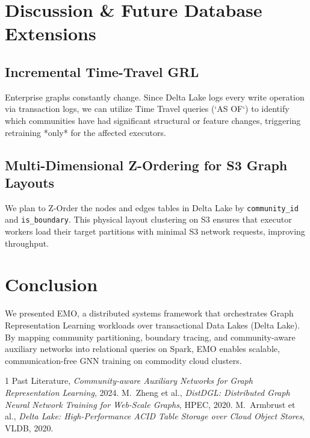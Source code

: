\documentclass[conference,compsoc]{IEEEtran}
\begin{document}
\section{Discussion \& Future Database Extensions}
\subsection{Incremental Time-Travel GRL}
Enterprise graphs constantly change. Since Delta Lake logs every write operation via transaction logs, we can utilize Time Travel queries (`AS OF`) to identify which communities have had significant structural or feature changes, triggering retraining *only* for the affected executors.

\subsection{Multi-Dimensional Z-Ordering for S3 Graph Layouts}
We plan to Z-Order the nodes and edges tables in Delta Lake by \verb|community_id| and \verb|is_boundary|. This physical layout clustering on S3 ensures that executor workers load their target partitions with minimal S3 network requests, improving throughput.

\section{Conclusion}
We presented EMO, a distributed systems framework that orchestrates Graph Representation Learning workloads over transactional Data Lakes (Delta Lake). By mapping community partitioning, boundary tracing, and community-aware auxiliary networks into relational queries on Spark, EMO enables scalable, communication-free GNN training on commodity cloud clusters.

\begin{thebibliography}{1}
Past Literature, \emph{Community-aware Auxiliary Networks for Graph Representation Learning}, 2024.
M.~Zheng et al., \emph{DistDGL: Distributed Graph Neural Network Training for Web-Scale Graphs}, HPEC, 2020.
M.~Armbrust et al., \emph{Delta Lake: High-Performance ACID Table Storage over Cloud Object Stores}, VLDB, 2020.
\end{thebibliography}
\end{document}
